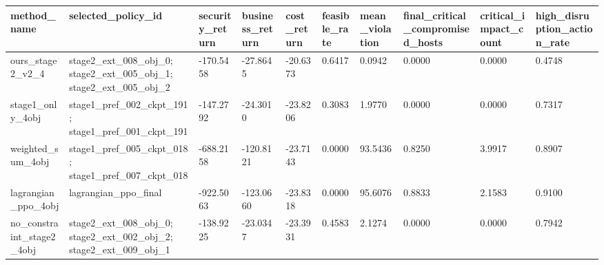\begin{tabular}{llllllllll}
\hline
method_name & selected_policy_id & security_return & business_return & cost_return & feasible_rate & mean_violation & final_critical_compromised_hosts & critical_impact_count & high_disruption_action_rate \\
\hline
ours_stage2_v2_4 & stage2_ext_008_obj_0; stage2_ext_005_obj_1; stage2_ext_005_obj_2 & -170.5458 & -27.8645 & -20.6373 & 0.6417 & 0.0942 & 0.0000 & 0.0000 & 0.4748 \\
stage1_only_4obj & stage1_pref_002_ckpt_191; stage1_pref_001_ckpt_191 & -147.2792 & -24.3010 & -23.8206 & 0.3083 & 1.9770 & 0.0000 & 0.0000 & 0.7317 \\
weighted_sum_4obj & stage1_pref_005_ckpt_018; stage1_pref_007_ckpt_018 & -688.2158 & -120.8121 & -23.7143 & 0.0000 & 93.5436 & 0.8250 & 3.9917 & 0.8907 \\
lagrangian_ppo_4obj & lagrangian_ppo_final & -922.5063 & -123.0660 & -23.8318 & 0.0000 & 95.6076 & 0.8833 & 2.1583 & 0.9100 \\
no_constraint_stage2_4obj & stage2_ext_008_obj_0; stage2_ext_002_obj_2; stage2_ext_009_obj_1 & -138.9225 & -23.0347 & -23.3931 & 0.4583 & 2.1274 & 0.0000 & 0.0000 & 0.7942 \\
\hline
\end{tabular}